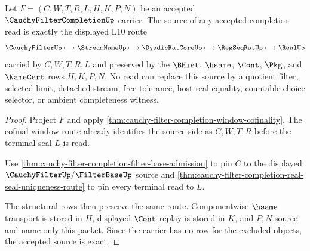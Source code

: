\begin{theorem}
\label{thm:cauchy-filter-completion-source-exactness}
Let $F=(C,W,T,R,L,H,K,P,N)$ be an accepted $\CauchyFilterCompletionUp$ carrier. The source of any accepted completion read is exactly the displayed L10 route
$$
\CauchyFilterUp \longmapsto \StreamNameUp \longmapsto \DyadicRatCoreUp \longmapsto \RegSeqRatUp \longmapsto \RealUp
$$
carried by $C,W,T,R,L$ and preserved by the $\BHist$, $\hsame$, $\Cont$, $\Pkg$, and $\NameCert$ rows $H,K,P,N$. No read can replace this source by a quotient filter, selected limit, detached stream, free tolerance, host real equality, countable-choice selector, or ambient completeness witness.
\end{theorem}
\begin{proof}
Project $F$ and apply \autoref{thm:cauchy-filter-completion-window-cofinality}. The cofinal window route already identifies the source side as $C,W,T,R$ before the terminal seal $L$ is read.

Use \autoref{thm:cauchy-filter-completion-filter-base-admission} to pin $C$ to the displayed $\CauchyFilterUp/\FilterBaseUp$ source and \autoref{thm:cauchy-filter-completion-real-seal-uniqueness-route} to pin every terminal read to $L$.

The structural rows then preserve the same route. Componentwise $\hsame$ transport is stored in $H$, displayed $\Cont$ replay is stored in $K$, and $P,N$ source and name only this packet. Since the carrier has no row for the excluded objects, the accepted source is exact.
\end{proof}

